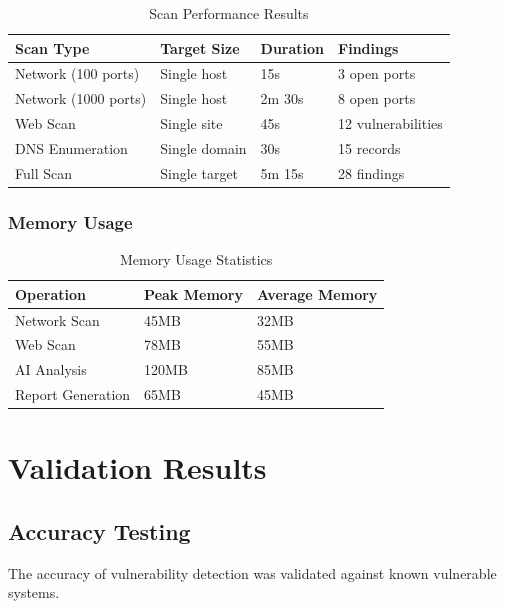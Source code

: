 \documentclass[12pt,a4paper]{report}
\begin{document}
\begin{table}[H]
    \centering
    \caption{Scan Performance Results}
    \label{tab:performance}
    \begin{tabular}{@{}llll@{}}
        \toprule
        Scan Type & Target Size & Duration & Findings \\
        \midrule
        Network (100 ports) & Single host & 15s & 3 open ports \\
        Network (1000 ports) & Single host & 2m 30s & 8 open ports \\
        Web Scan & Single site & 45s & 12 vulnerabilities \\
        DNS Enumeration & Single domain & 30s & 15 records \\
        Full Scan & Single target & 5m 15s & 28 findings \\
        \bottomrule
    \end{tabular}
\end{table}

\subsubsection{Memory Usage}

\begin{table}[H]
    \centering
    \caption{Memory Usage Statistics}
    \label{tab:memory}
    \begin{tabular}{@{}lll@{}}
        \toprule
        Operation & Peak Memory & Average Memory \\
        \midrule
        Network Scan & 45MB & 32MB \\
        Web Scan & 78MB & 55MB \\
        AI Analysis & 120MB & 85MB \\
        Report Generation & 65MB & 45MB \\
        \bottomrule
    \end{tabular}
\end{table}

\section{Validation Results}

\subsection{Accuracy Testing}

The accuracy of vulnerability detection was validated against known vulnerable systems.
\end{document}
